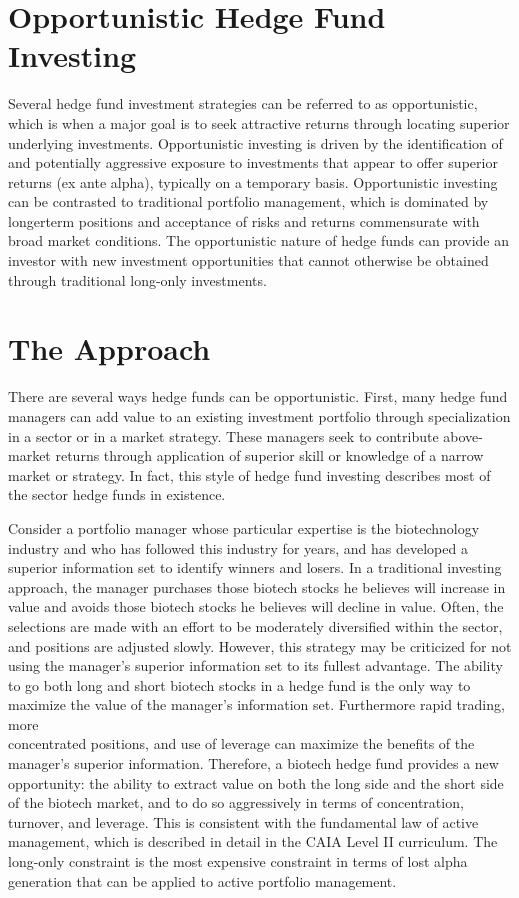 \documentclass[11pt]{article}
\begin{document}
\section*{Opportunistic Hedge Fund Investing}
Several hedge fund investment strategies can be referred to as opportunistic, which is when a major goal is to seek attractive returns through locating superior underlying investments. Opportunistic investing is driven by the identification of and potentially aggressive exposure to investments that appear to offer superior returns (ex ante alpha), typically on a temporary basis. Opportunistic investing can be contrasted to traditional portfolio management, which is dominated by longerterm positions and acceptance of risks and returns commensurate with broad market conditions. The opportunistic nature of hedge funds can provide an investor with new investment opportunities that cannot otherwise be obtained through traditional long-only investments.

\section*{The Approach}
There are several ways hedge funds can be opportunistic. First, many hedge fund managers can add value to an existing investment portfolio through specialization in a sector or in a market strategy. These managers seek to contribute above-market returns through application of superior skill or knowledge of a narrow market or strategy. In fact, this style of hedge fund investing describes most of the sector hedge funds in existence.

Consider a portfolio manager whose particular expertise is the biotechnology industry and who has followed this industry for years, and has developed a superior information set to identify winners and losers. In a traditional investing approach, the manager purchases those biotech stocks he believes will increase in value and avoids those biotech stocks he believes will decline in value. Often, the selections are made with an effort to be moderately diversified within the sector, and positions are adjusted slowly. However, this strategy may be criticized for not using the manager's superior information set to its fullest advantage. The ability to go both long and short biotech stocks in a hedge fund is the only way to maximize the value of the manager's information set. Furthermore rapid trading, more\\
concentrated positions, and use of leverage can maximize the benefits of the manager's superior information. Therefore, a biotech hedge fund provides a new opportunity: the ability to extract value on both the long side and the short side of the biotech market, and to do so aggressively in terms of concentration, turnover, and leverage. This is consistent with the fundamental law of active management, which is described in detail in the CAIA Level II curriculum. The long-only constraint is the most expensive constraint in terms of lost alpha generation that can be applied to active portfolio management.
\end{document}

